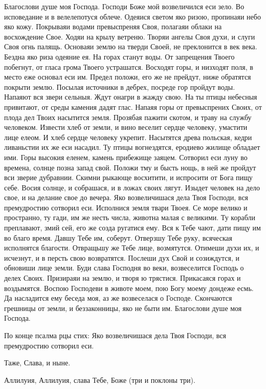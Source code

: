 Благослови душе моя Господа. Господи Боже мой возвеличился еси зело. Во исповедание и в велелепотуся облече. Одеяися светом яко ризою, пропинаяи небо яко кожу. Покрываяи водами превыспреняя Своя, полагаяи облаки на восхождение Свое. Ходяи на крылу ветреню. Творяи ангелы Своя духи, и слуги Своя огнь палящь. Основаяи землю на тверди Своей, не преклонится в век века. Бездна яко риза одеяние ея. На горах станут воды. От запрещения Твоего побегнут, от гласа грома Твоего устрашатся. Восходят горы, и низходят поля, в место еже основал еси им. Предел положи, его же не прейдут, ниже обратятся покрыти землю. Посылая источники в дебрех, посреде гор пройдут воды. Напаяют вся звери сельныя. Ждут онагри  в жажду свою. На ты птицы небесныя привитают, от  среды камения дадят глас. Напаяя горы от превыспрених Своих, от плода дел Твоих насытится земля. Прозябая пажити скотом, и траву на службу человеком. Извести хлеб от земли, и вино веселит сердце человеку, умастити лице елеом. И хлеб сердце человеку укрепит. Насытятся древа польская, кедри ливаньстии их же еси насадил. Ту птицы вогнездятся, еродиево жилище обладает ими. Горы высокия еленем, камень прибежище заяцем. Сотворил еси луну во времена, солнце позна запад свой. Положи тму и бысть нощь, в ней же пройдут вси зверие дубравнии. Скимни рыкающе восхитити, и испросити от Бога пищу себе. Восия солнце, и собрашася, и в ложах своих лягут. Изыдет человек на дело свое, и на делание свое до вечера. Яко возвеличишася дела Твоя Господи, вся премудростию сотворил еси. Исполнися земля твари Твоея. Се море велико и пространно, ту гади, им же несть числа, животна малая с великими. Ту корабли преплавают, змий сей, его же созда ругатися ему. Вся к Тебе чают, дати пищу им во благо время. Давшу Тебе им, соберут. Отверзшу Тебе руку, всяческая исполнятся благости. Отвращьшу же Тебе лице, возмятутся. Отимеши духи их, и исчезнут, и в персть свою возвратятся. Послеши дух Свой и созиждутся, и обновиши лице земли. Буди слава Господня во веки, возвеселится Господь о делех Своих. Призираяи на землю, и творя ю трястися. Прикасаяся горах и воздымятся. Воспою Господеви в животе моем, пою Богу моему дондеже есмь. Да насладится ему беседа моя, аз же возвеселася о Господе. Скончаются грешницы от земли, и беззаконницы, яко не быти им. Благослови душе моя Господа. 

По конце псалма рцы стих: Яко возвеличишася дела Твоя Господи, вся премудростию сотворил еси. 

Таже, Слава, и ныне.

Аллилуия, Аллилуия, слава Тебе, Боже (три и поклоны три).

